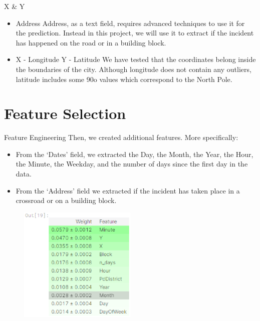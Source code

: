 \documentclass[
 size=14pt,
 paper=smartboard,  %
 mode=present, 		%
 display=slides, 	%
 style=tuliplab,  	%
 pauseslide,
 fleqn,leqno]{powerdot}
\begin{document}



\begin{slide}{X \& Y}
  \begin{itemize}
  \item Address
Address, as a text field, requires advanced techniques to use 
it for the prediction. Instead in this project, we will use it to 
extract if the incident has happened on the road or in a building block.
\item X - Longitude Y - Latitude
We have tested that the coordinates belong inside the
 boundaries of the city. Although longitude does not contain any
  outliers, latitude includes some 90o values which correspond to the North Pole.
\end{itemize}
\end{slide}


\section{Feature Selection} 



\begin{slide}{Feature Engineering}
  Then, we created additional features. More specifically:
\begin{itemize}
  \item From the ‘Dates’ field, we extracted the Day, the Month, the
   Year, the Hour, the Minute, the Weekday, and the number of days 
   since the first day in the data.

  \item From the ‘Address’ field we extracted if the incident has taken
   place in a crossroad or on a building block.
\end{itemize}

\begin{figure}
  \centering
  \includegraphics[width=0.5\textwidth]{kaggle/14.eps}
\end{figure}
  
\end{slide}
\end{document}
